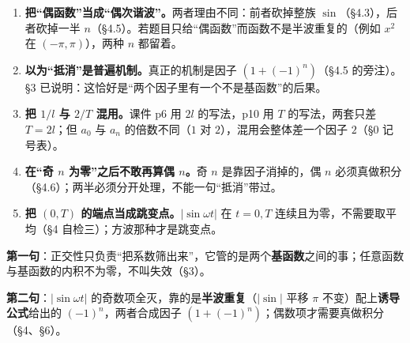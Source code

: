 \documentclass[11pt]{ctexart}
\begin{document}
\begin{enumerate}
\item \textbf{把“偶函数”当成“偶次谐波”。}两者理由不同：前者砍掉整族 $\sin$（§4.3），后者砍掉一半 $n$（§4.5）。若题目只给“偶函数”而函数不是半波重复的（例如 $x^2$ 在 $(-\pi,\pi)$），两种 $n$ 都留着。
\item \textbf{以为“抵消”是普遍机制。}真正的机制是因子 $(1+(-1)^n)$（§4.5 的旁注）。§3 已说明：这恰好是“两个因子里有一个不是基函数”的后果。
\item \textbf{把 $1/l$ 与 $2/T$ 混用。}课件 p6 用 $2l$ 的写法，p10 用 $T$ 的写法，两套只差 $T=2l$；但 $a_0$ 与 $a_n$ 的倍数不同（$1$ 对 $2$），混用会整体差一个因子 $2$（§0 记号表）。
\item \textbf{在“奇 $n$ 为零”之后不敢再算偶 $n$。}奇 $n$ 是靠因子消掉的，偶 $n$ 必须真做积分（§4.6）；两半必须分开处理，不能一句“抵消”带过。
\item \textbf{把 $(0,T)$ 的端点当成跳变点。}$|\sin\omega t|$ 在 $t=0,T$ 连续且为零，不需要取平均（§4 自检三）；方波那种才是跳变点。
\end{enumerate}









\textbf{第一句}：正交性只负责“把系数筛出来”，它管的是两个\textbf{基函数}之间的事；任意函数与基函数的内积不为零，不叫失效（§3）。

\textbf{第二句}：$|\sin\omega t|$ 的奇数项全灭，靠的是\textbf{半波重复}（$| \sin|$ 平移 $\pi$ 不变）配上\textbf{诱导公式}给出的 $(-1)^n$，两者合成因子 $(1+(-1)^n)$；偶数项才需要真做积分（§4、§6）。
\end{document}
